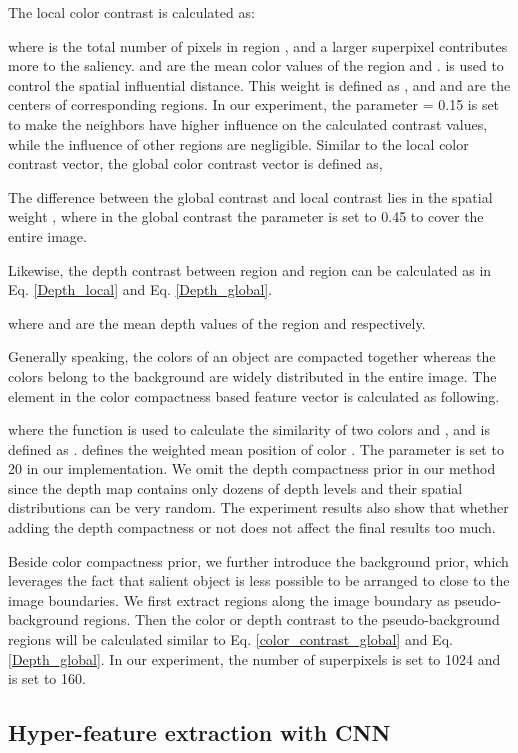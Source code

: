 \documentclass[journal]{IEEEtran}
\begin{document}
The local color contrast  is calculated as:

where  is the total number of pixels in region , and a larger superpixel contributes more to the saliency.  and  are the mean color values of the region  and .  is used to control the spatial influential distance. This weight is defined as , and  and  are the centers of corresponding regions. In our experiment, the parameter  = 0.15 is set to make the neighbors have higher influence on the calculated contrast values, while the influence of other regions are negligible. Similar to the local color contrast vector, the global color contrast vector is defined as,

The difference between the global contrast and local contrast lies in the spatial weight , where in the global contrast the parameter  is set to 0.45 to cover the entire image.

Likewise, the depth contrast between region  and region  can be calculated as in Eq. \ref{Depth_local} and Eq. \ref{Depth_global}.


where  and  are the mean depth values of the region  and  respectively.

Generally speaking, the colors of an object are compacted together whereas the colors belong to the background are widely distributed in the entire image. The element  in the color compactness based feature vector is calculated as following.

where the function  is used to calculate the similarity of two colors  and , and is defined as .  defines the weighted mean position of color . The parameter  is set to 20 in our implementation. We omit the depth compactness prior in our method since the depth map contains only dozens of depth levels and their spatial distributions can be very random. The experiment results also show that whether adding the depth compactness or not does not affect the final results too much.

Beside color compactness prior, we further introduce the background prior, which leverages the fact that salient object is less possible to be arranged to close to the image boundaries. We first extract  regions along the image boundary as pseudo-background regions. Then the color or depth contrast to the pseudo-background regions will be calculated similar to Eq. \ref{color_contrast_global} and Eq. \ref{Depth_global}. In our experiment, the number of superpixels  is set to 1024 and  is set to 160.

\subsection{Hyper-feature extraction with CNN}\label{title_3_2}
\end{document}
